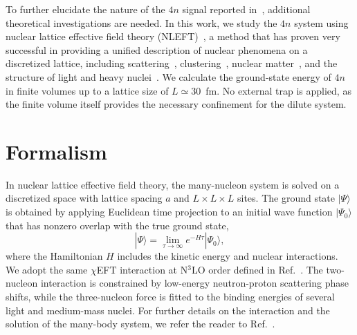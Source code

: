 \documentclass[aps,prl,showpacs,twocolumn,preprintnumbers,superscriptaddress,nofootinbib,floatfix,10pt]{revtex4-1}
\begin{document}
To further elucidate the nature of the $4n$ signal reported in~\cite{Duer:2022ehf}, additional theoretical investigations are needed. In this work, we study the $4n$ system using nuclear lattice effective field theory (NLEFT)~\cite{Lee:2025req,Lahde:2019npb}, a method that has proven very successful in providing a unified description of nuclear phenomena on a discretized lattice, including scattering~\cite{Elhatisari:2025fyu,Wu:2025fkn,Elhatisari:2016hui,Elhatisari:2015iga}, clustering~\cite{Epelbaum:2011md,Epelbaum:2012qn,Shen:2022bak,Shen:2024qzi}, nuclear matter~\cite{Tong:2025fzv,Tong:2024jvs,Ma:2023ahg,Ren:2023ued,Lu:2019nbg}, and the structure of light and heavy nuclei~\cite{Hildenbrand:2025voq,Ren:2025vpe,Song:2025ofd,Niu:2025uxk,Wang:2025swg,Zhang:2024wfd,Hildenbrand:2024ypw,Meissner:2023cvo,Sarkar:2023qjn,Lu:2021tab,Shen:2021kqr}. We calculate the ground-state energy of $4n$ in finite volumes up to a lattice size of $L\simeq 30$~fm. No external trap is applied, as the finite volume itself provides the necessary confinement for the dilute system.


\section{Formalism}

In nuclear lattice effective field theory, the many-nucleon system is solved on a discretized space with lattice spacing $a$ and $L\times L\times L$ sites.
The ground state $|\Psi\rangle$ is obtained by applying Euclidean time projection to an initial wave function $|\Psi_0\rangle$ that has nonzero overlap with the true ground state,
\begin{equation}\label{eq:proj}
  |\Psi\rangle = \lim_{\tau\to\infty} e^{-H\tau} |\Psi_0\rangle,
\end{equation}
where the Hamiltonian $H$ includes the kinetic energy and nuclear interactions.
We adopt the same $\chi$EFT interaction at N$^3$LO order defined in Ref.~\cite{Elhatisari:2022zrb}.
The two-nucleon interaction is constrained by low-energy neutron-proton scattering phase shifts, while the three-nucleon force is fitted to the binding energies of several light and medium-mass nuclei.
For further details on the interaction and the solution of the many-body system, we refer the reader to Ref.~\cite{Elhatisari:2022zrb}.
\end{document}
